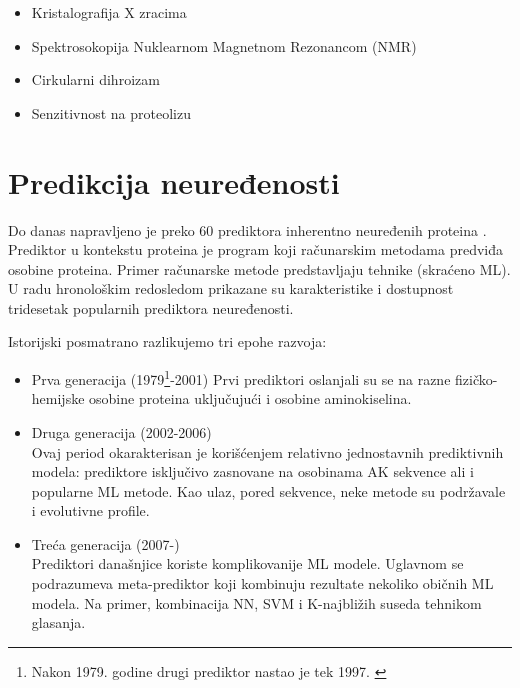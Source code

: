 \begin{itemize}
  \item Kristalografija X zracima  
  \item Spektrosokopija Nuklearnom Magnetnom Rezonancom (NMR) 
  \item Cirkularni dihroizam 
  \item Senzitivnost na proteolizu 
\end{itemize}


\section{Predikcija neuređenosti}

Do danas napravljeno je preko 60 prediktora inherentno neuređenih proteina
\parencite{Meng2017}. Prediktor u kontekstu proteina je program koji 
računarskim metodama predviđa osobine proteina. Primer računarske metode
predstavljaju tehnike  (skraćeno ML).  U radu
\parencite{Meng_c2017} hronološkim redosledom prikazane su karakteristike i
dostupnost tridesetak popularnih prediktora neuređenosti.


Istorijski posmatrano razlikujemo tri epohe razvoja: \parencite{Meng_c2017}
\begin{itemize}
  \item Prva generacija (1979\footnote{
      Nakon 1979. godine drugi prediktor nastao je tek 1997.
      \parencite{Meng_c2017} }-2001)
    Prvi prediktori oslanjali su se na razne fizičko-hemijske osobine proteina
    uključujući i osobine aminokiselina. 

  \item Druga generacija (2002-2006)\\
    Ovaj period okarakterisan je korišćenjem relativno jednostavnih
    prediktivnih modela: prediktore isključivo zasnovane na osobinama AK
    sekvence ali i popularne ML metode. Kao ulaz, pored sekvence, neke metode su
    podržavale i evolutivne profile.

  \item Treća generacija (2007-)\\
    Prediktori današnjice koriste komplikovanije ML modele. Uglavnom  se
    podrazumeva meta-prediktor koji kombinuju rezultate nekoliko običnih ML
    modela. Na primer, kombinacija NN, SVM i K-najbližih suseda tehnikom
    glasanja.

\end{itemize}


